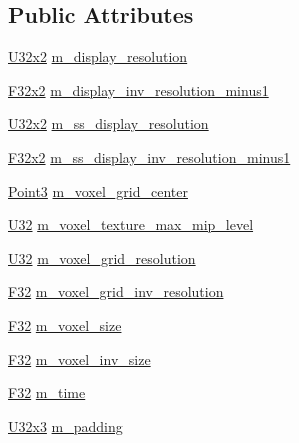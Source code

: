 \subsection*{Public Attributes}
\begin{DoxyCompactItemize}
\item 
\hyperlink{namespacemage_a88e05bff0300120c013285d3dcad95c5}{U32x2} \hyperlink{structmage_1_1rendering_1_1_world_buffer_aafc4835b9b42d7688b3930768f732ea0}{m\+\_\+display\+\_\+resolution}
\item 
\hyperlink{namespacemage_aa87237ad091f5cd7da612b8523fc108f}{F32x2} \hyperlink{structmage_1_1rendering_1_1_world_buffer_a0e560c63f0829df4d772cf05ca1fcffa}{m\+\_\+display\+\_\+inv\+\_\+resolution\+\_\+minus1}
\item 
\hyperlink{namespacemage_a88e05bff0300120c013285d3dcad95c5}{U32x2} \hyperlink{structmage_1_1rendering_1_1_world_buffer_a76def4c6b834b74a9505464d5f6192e5}{m\+\_\+ss\+\_\+display\+\_\+resolution}
\item 
\hyperlink{namespacemage_aa87237ad091f5cd7da612b8523fc108f}{F32x2} \hyperlink{structmage_1_1rendering_1_1_world_buffer_a0b4e2ea6d206d02bb40e8f3571d95bf8}{m\+\_\+ss\+\_\+display\+\_\+inv\+\_\+resolution\+\_\+minus1}
\item 
\hyperlink{structmage_1_1_point3}{Point3} \hyperlink{structmage_1_1rendering_1_1_world_buffer_af62ba25b808701284c93fe2ccf4541c9}{m\+\_\+voxel\+\_\+grid\+\_\+center}
\item 
\hyperlink{namespacemage_a41c104c036fba3756a74e19f793eeaa1}{U32} \hyperlink{structmage_1_1rendering_1_1_world_buffer_af891d0c776313dcf06048d78a2ad4853}{m\+\_\+voxel\+\_\+texture\+\_\+max\+\_\+mip\+\_\+level}
\item 
\hyperlink{namespacemage_a41c104c036fba3756a74e19f793eeaa1}{U32} \hyperlink{structmage_1_1rendering_1_1_world_buffer_ad1a59cf980681b0b9ec246057fe2ed70}{m\+\_\+voxel\+\_\+grid\+\_\+resolution}
\item 
\hyperlink{namespacemage_aa97e833b45f06d60a0a9c4fc22ae02c0}{F32} \hyperlink{structmage_1_1rendering_1_1_world_buffer_a5f4fc26acde41470c46991b9981de12c}{m\+\_\+voxel\+\_\+grid\+\_\+inv\+\_\+resolution}
\item 
\hyperlink{namespacemage_aa97e833b45f06d60a0a9c4fc22ae02c0}{F32} \hyperlink{structmage_1_1rendering_1_1_world_buffer_af18be87bdb94066df7bd5e52409b1c16}{m\+\_\+voxel\+\_\+size}
\item 
\hyperlink{namespacemage_aa97e833b45f06d60a0a9c4fc22ae02c0}{F32} \hyperlink{structmage_1_1rendering_1_1_world_buffer_a86982007f533ae368a5c3b09dcbf4db6}{m\+\_\+voxel\+\_\+inv\+\_\+size}
\item 
\hyperlink{namespacemage_aa97e833b45f06d60a0a9c4fc22ae02c0}{F32} \hyperlink{structmage_1_1rendering_1_1_world_buffer_a56f828aba079ff56ef931c1f9c903a38}{m\+\_\+time}
\item 
\hyperlink{namespacemage_ab3633c193f686845fcf80ce95d18a20b}{U32x3} \hyperlink{structmage_1_1rendering_1_1_world_buffer_abd57dceab6a7f9626b4b357494165e7c}{m\+\_\+padding}
\end{DoxyCompactItemize}


